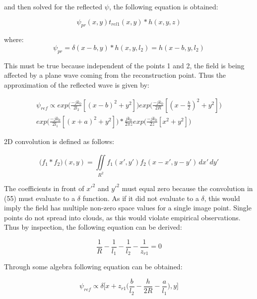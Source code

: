 \documentclass[12pt]{article}
\begin{document}
and then solved for the reflected \(\psi\), the following equation is obtained:

\begin{equation}
	\psi_{pr}(x,y)t_{rel1}(x,y)*h(x,y,z)
\end{equation}

where:
\begin{equation}
	\psi_{pr} = \delta(x - b,y)*h(x,y,l_{2}) = h(x - b,y,l_{2})
\end{equation}

This must be true because independent of the points 1 and 2, the field is being
affected by a plane wave coming from the reconstruction point. Thus the approximation of the reflected wave is given by:

\begin{equation}
	\begin{multlined}
	\psi_{ref} \propto exp\bigg(\frac{-jk_{0}}{2l_{2}}[(x - b)^2 + y^2]\bigg)
	exp\bigg(\frac{-jk_{0}}{2R}[(x - \frac{h}{2})^2 + y^2]\bigg)
	\\exp\bigg(\frac{-jk_{0}}{2l_{1}}[(x + a)^2 + y^2]\bigg)
	*\frac{jk_{0}}{2\pi z}exp\bigg(\frac{-jk_{0}}{2z}[x^2 + y^2]\bigg)
	\end{multlined}
\end{equation}

2D convolution is defined as follows:

\begin{equation}
	\big(f_{1}*f_{2}\big)(x,y) = \iint \limits_{R^2}^{} f_{1}(x',y')f_{2}(x - x',y - y') \,dx'\,dy'
\end{equation}

The coefficients in front of \(x'^2\) and \(y'^2\) must equal zero because the convolution in (55) must evaluate to a \(\delta\) function.
As if it did not evaluate to a \(\delta\), this would imply the field has multiple non-zero space values for a single image point. Single points do not spread into clouds, as this would violate empirical observations. Thus by inspection, the following equation can be derived:

\begin{equation}
	\frac{1}{R} - \frac{1}{l_{1}} - \frac{1}{l_{2}} - \frac{1}{z_{r1}} = 0
\end{equation}

Through some algebra following equation can be obtained:

\begin{equation}
	\psi_{ref} \propto \delta \bigg[ x + z_{r1}\bigg(
	\frac{b}{l_{2}} - \frac{h}{2R} - \frac{a}{l_{1}}\bigg),y\bigg]
\end{equation}
\end{document}
